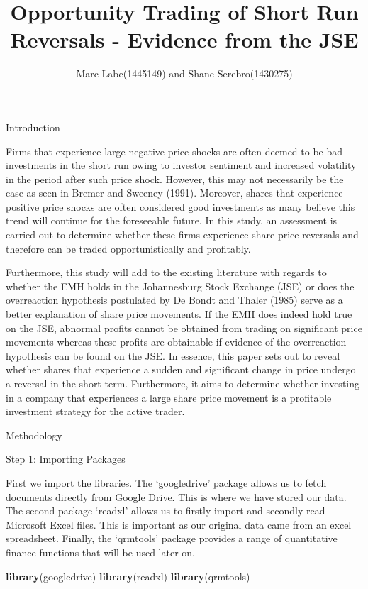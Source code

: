 \documentclass[]{article}
\title{Opportunity Trading of Short Run Reversals - Evidence from the JSE}
\author{Marc Labe(1445149) and Shane Serebro(1430275)}
\date{}
\newenvironment{Shaded}{\begin{snugshade}}{\end{snugshade}}
\newcommand{\KeywordTok}[1]{\textcolor[rgb]{0.13,0.29,0.53}{\textbf{#1}}}
\newcommand{\NormalTok}[1]{#1}
\begin{document}
\maketitle

Introduction

Firms that experience large negative price shocks are often deemed to be
bad investments in the short run owing to investor sentiment and
increased volatility in the period after such price shock. However, this
may not necessarily be the case as seen in Bremer and Sweeney (1991).
Moreover, shares that experience positive price shocks are often
considered good investments as many believe this trend will continue for
the foreseeable future. In this study, an assessment is carried out to
determine whether these firms experience share price reversals and
therefore can be traded opportunistically and profitably.

Furthermore, this study will add to the existing literature with regards
to whether the EMH holds in the Johannesburg Stock Exchange (JSE) or
does the overreaction hypothesis postulated by De Bondt and Thaler
(1985) serve as a better explanation of share price movements. If the
EMH does indeed hold true on the JSE, abnormal profits cannot be
obtained from trading on significant price movements whereas these
profits are obtainable if evidence of the overreaction hypothesis can be
found on the JSE. In essence, this paper sets out to reveal whether
shares that experience a sudden and significant change in price undergo
a reversal in the short-term. Furthermore, it aims to determine whether
investing in a company that experiences a large share price movement is
a profitable investment strategy for the active trader.

Methodology

Step 1: Importing Packages

First we import the libraries. The `googledrive' package allows us to
fetch documents directly from Google Drive. This is where we have stored
our data. The second package `readxl' allows us to firstly import and
secondly read Microsoft Excel files. This is important as our original
data came from an excel spreadsheet. Finally, the `qrmtools' package
provides a range of quantitative finance functions that will be used
later on.

\begin{Shaded}
\begin{Highlighting}[]
\KeywordTok{library}\NormalTok{(googledrive)}
\KeywordTok{library}\NormalTok{(readxl)}
\KeywordTok{library}\NormalTok{(qrmtools)}
\end{Highlighting}
\end{Shaded}
\end{document}
